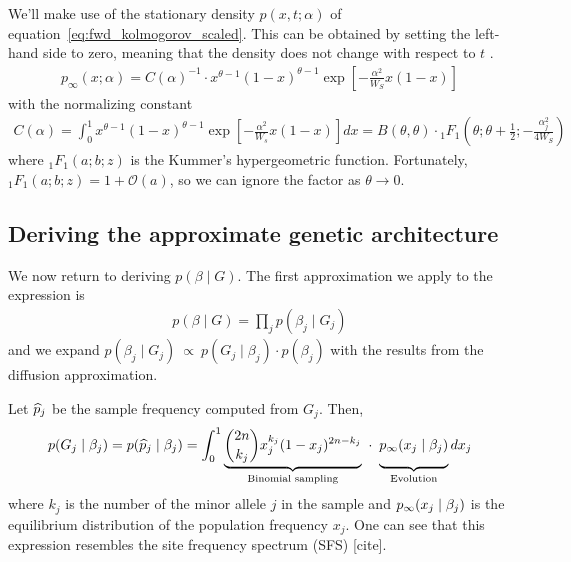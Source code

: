 \documentclass[10pt]{article}
\begin{document}
We'll make use of the stationary density $p(x,t;\alpha)$ of equation~\ref{eq:fwd_kolmogorov_scaled}.
This can be obtained by setting the left-hand side to zero, meaning that the density does not change with respect to $t$ \citep{Ewens2004mathpopgen}.
\begin{align} \label{eq:stat_dist}
     p_{\infty}(x;\alpha) = C(\alpha)^{-1} \cdot
     x^{\theta-1}(1-x)^{\theta-1} 
     \exp\left[-\frac{\alpha^2}{W_S}x(1-x) \right]
\end{align}
with the normalizing constant 
\begin{align} \label{eq:norm_const}
    C(\alpha) = \int_0^1 x^{\theta-1}(1-x)^{\theta-1} 
    \exp\left[-\frac{\alpha^2}{W_s}x(1-x) \right] dx = B(\theta, \theta) 
    \cdot {_1F_1} \left(
    \theta; \theta + \frac{1}{2}; -\frac{\alpha_j^2}{4W_S}
    \right)
\end{align}
where $_1F_1(a;b;z)$ is the Kummer's hypergeometric function.
Fortunately, $_1F_1(a;b;z) = 1 + \mathcal{O}(a)$, so we can ignore the factor as $\theta \rightarrow 0$.

\subsection{Deriving the approximate genetic architecture}

We now return to deriving $p(\beta \mid G)$.
The first approximation we apply to the expression is
\begin{align} \label{eq:mean_field}
    p(\beta \mid G) = \prod_j p(\beta_j \mid G_j)
\end{align}
and we expand $p(\beta_j \mid G_j)\ \propto \ p(G_j \mid \beta_j) \cdot p(\beta_j)$ with the results from the diffusion approximation.

Let $\widehat{p}_j$ be the sample frequency computed from $G_j$. Then,
\begin{align} \label{eq:xll}
        p(G_j \mid \beta_j) 
        = p(\hp_j \mid \beta_j) 
        = \int_0^1 
        \underbrace{\binom{2n}{k_j} x_j^{k_j}(1-x_j)^{2n-k_j}}_{\text{Binomial sampling}}
        \ \cdot \ 
        \underbrace{\vphantom{\binom{1}{k_j}}\pinf(x_j \mid \beta_j)}_{\text{Evolution}} dx_j
\end{align}
where $k_j$ is the number of the minor allele $j$ in the sample and $p_{\infty}(x_j \mid \beta_j)$ is the equilibrium distribution of the population frequency $x_j$.
One can see that this expression resembles the site frequency spectrum (SFS) [cite].
\end{document}
